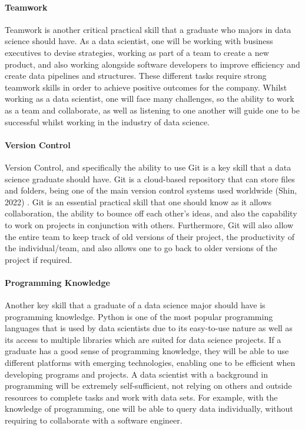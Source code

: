 \documentclass[a4paper, 11pt]{report}
\begin{document}
	\paragraph{Teamwork} Teamwork is another critical practical skill that a graduate who majors in data science should have. As a data scientist, one will be working with business executives to devise strategies, working as part of a team to create a new product, and also working alongside software developers to improve efficiency and create data pipelines and structures. These different tasks require strong teamwork skills in order to achieve positive outcomes for the company. Whilst working as a data scientist, one will face many challenges, so the ability to work as a team and collaborate, as well as listening to one another will guide one to be successful whilst working in the industry of data science. 
	
	\paragraph{Version Control} Version Control, and specifically the ability to use Git is a key skill that a data science graduate should have. Git is a cloud-based repository that can store files and folders, being one of the main version control systems used worldwide (Shin, 2022)
	. Git is an essential practical skill that one should know as it allows collaboration, the ability to bounce off each other’s ideas, and also the capability to work on projects in conjunction with others. Furthermore, Git will also allow the entire team to keep track of old versions of their project, the productivity of the individual/team, and also allows one to go back to older versions of the project if required. 
	
	\paragraph{Programming Knowledge} Another key skill that a graduate of a data science major should have is programming knowledge. Python is one of the most popular programming languages that is used by data scientists due to its easy-to-use nature as well as its access to multiple libraries which are suited for data science projects. If a graduate has a good sense of programming knowledge, they will be able to use different platforms with emerging technologies, enabling one to be efficient when developing programs and projects. A data scientist with a background in programming will be extremely self-sufficient, not relying on others and outside resources to complete tasks and work with data sets. For example, with the knowledge of programming, one will be able to query data individually, without requiring to collaborate with a software engineer. 
	
\end{document}
